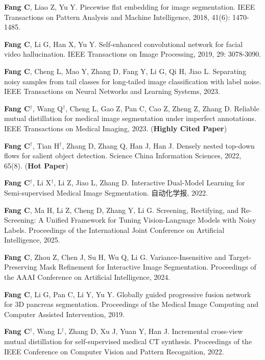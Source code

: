 \documentclass[a4paper,36pt]{article}
\newcommand{\tb}[1]{\textbf{#1}}
\newcommand{\resumeItemWithoutTitle}[1]{
  \item\justifying\small{
    {#1 \vspace{-2pt}}
  }
}
\newcommand{\resumeChnItemWithoutTitle}[1]{
  \item\justifying\small{
    {\begin{CJK}{UTF8}{gbsn}#1\end{CJK} \vspace{-2pt}}
  }
}
\begin{document}
\resumeItemWithoutTitle{\tb{Fang C}, Liao Z, Yu Y. Piecewise flat embedding for image segmentation. IEEE Transactions on Pattern Analysis and Machine Intelligence, 2018, 41(6): 1470-1485. }

\resumeItemWithoutTitle{\tb{Fang C}, Li G, Han X, Yu Y. Self-enhanced convolutional network for facial video hallucination. IEEE Transactions on Image Processing, 2019, 29: 3078-3090. }

\resumeItemWithoutTitle{\tb{Fang C}, Cheng L, Mao Y, Zhang D, Fang Y, Li G, Qi H, Jiao L. Separating noisy samples from tail classes for long-tailed image classification with label noise. IEEE Transactions on Neural Networks and Learning Systems, 2023.}

\resumeItemWithoutTitle{\tb{Fang C}$^\dag$, Wang Q$^\dag$, Cheng L, Gao Z, Pan C, Cao Z, Zheng Z, Zhang D. Reliable mutual distillation for medical image segmentation under imperfect annotations. IEEE Transactions on Medical Imaging, 2023. (\tb{Highly Cited Paper})}

\resumeItemWithoutTitle{\tb{Fang C}$^\dag$, Tian H$^\dag$, Zhang D, Zhang Q, Han J, Han J. Densely nested top-down flows for salient object detection. Science China Information Sciences, 2022, 65(8). (\tb{Hot Paper}) }

\resumeChnItemWithoutTitle{\textbf{Fang C}$^\dag$, Li X$^\dag$, Li Z, Jiao L, Zhang D. Interactive Dual-Model Learning for Semi-supervised Medical Image Segmentation. 自动化学报, 2022.}

\resumeItemWithoutTitle{\tb{Fang C}, Ma H, Li Z, Cheng D, Zhang Y, Li G. Screening, Rectifying, and Re-Screening: A Unified Framework for Tuning Vision-Language Models with Noisy Labels. Proceedings of the International Joint Conference on Artificial Intelligence, 2025.} 
\vspace{-10pt}

\resumeItemWithoutTitle{\tb{Fang C}, Zhou Z, Chen J, Su H, Wu Q, Li G. Variance-Insensitive and Target-Preserving Mask Refinement for Interactive Image Segmentation. Proceedings of the AAAI Conference on Artificial Intelligence, 2024. }

\resumeItemWithoutTitle{\tb{Fang C}, Li G, Pan C, Li Y, Yu Y. Globally guided progressive fusion network for 3D pancreas segmentation. Proceedings of the Medical Image Computing and Computer Assisted Intervention, 2019.}

\resumeItemWithoutTitle{\tb{Fang C}$^{\dag}$, Wang L$^{\dag}$, Zhang D, Xu J, Yuan Y, Han J. Incremental cross-view mutual distillation for self-supervised medical CT synthesis. Proceedings of the IEEE Conference on Computer Vision and Pattern Recognition, 2022.}
\end{document}

